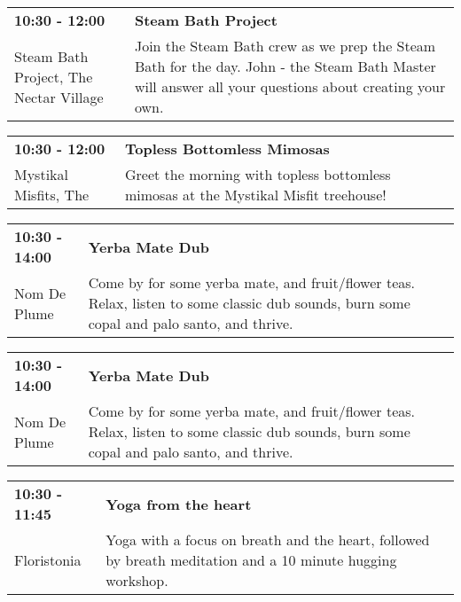 \begin{tabular}{ p{1in} p{2.2in} }
    \textbf{10:30 - 12:00} & \textbf{Steam Bath Project} \\
    Steam Bath Project, The \newline Nectar Village & Join the Steam Bath crew as we prep the Steam Bath for the day. John - the Steam Bath Master will answer all your questions about creating your own. \\
    \hline 
\end{tabular}
    
\begin{tabular}{ p{1in} p{2.2in} }
    \textbf{10:30 - 12:00} & \textbf{Topless Bottomless Mimosas} \\
    Mystikal Misfits, The \newline  & Greet the morning with topless bottomless mimosas at the Mystikal Misfit treehouse! \\
    \hline 
\end{tabular}
    
\begin{tabular}{ p{1in} p{2.2in} }
    \textbf{10:30 - 14:00} & \textbf{Yerba Mate Dub} \\
    Nom De Plume \newline  & Come by for some yerba mate, and fruit/flower teas. Relax, listen to some classic dub sounds, burn some copal and palo santo, and thrive. \\
    \hline 
\end{tabular}
    
\begin{tabular}{ p{1in} p{2.2in} }
    \textbf{10:30 - 14:00} & \textbf{Yerba Mate Dub} \\
    Nom De Plume \newline  & Come by for some yerba mate, and fruit/flower teas. Relax, listen to some classic dub sounds, burn some copal and palo santo, and thrive. \\
    \hline 
\end{tabular}
    
\begin{tabular}{ p{1in} p{2.2in} }
    \textbf{10:30 - 11:45} & \textbf{Yoga from the heart} \\
    Floristonia \newline  & Yoga with a focus on breath and the heart, followed by breath meditation and a 10 minute hugging workshop. \\
    \hline 
\end{tabular}
    

